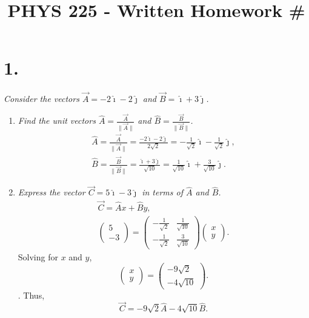 \documentclass[12pt]{article}
\title{\vspace{-2\baselineskip}PHYS 225 - Written Homework \#\HOMEWORKNUM}
\author{\NAME}
\date{\DATE}
\begin{document}
\maketitle


\section*{1.}
\textit{Consider the vectors $\vec{A} = -2\hat{\imath} - 2\hat{\jmath}$ and
$\vec{B} = \hat{\imath} + 3\hat{\jmath}$.}
\begin{enumerate}[label=(\alph*)]
	\item \textit{Find the unit vectors
	$\hat{A} = \frac{\vec{A}}{\|\vec{A}\|}$ and
	$\hat{B} = \frac{\vec{B}}{\|\vec{B}\|}$.}
	\begin{gather*}
		\hat{A}
		= \frac{\vec{A}}{\|\vec{A}\|}
		= \frac{-2\hat{\imath} - 2\hat{\jmath}}{2\sqrt{2}}
		= \boxed{
			-\frac{1}{\sqrt{2}} \hat{\imath}
			- \frac{1}{\sqrt{2}} \hat{\jmath}
		}, \\
		\hat{B}
		= \frac{\vec{B}}{\|\vec{B}\|}
		= \frac{\hat{\imath} + 3\hat{\jmath}}{\sqrt{10}}
		= \boxed{
			\frac{1}{\sqrt{10}} \hat{\imath}
			+ \frac{3}{\sqrt{10}} \hat{\jmath}
		}.
	\end{gather*}
	\item \textit{Express the vector $\vec{C} = 5\hat{\imath} - 3\hat{\jmath}$
	in terms of $\hat{A}$ and $\hat{B}$.}
	\begin{gather*}
		\vec{C} = \hat{A}x + \hat{B}y, \\
		\begin{pmatrix} 5 \\ -3 \end{pmatrix}
		=
		\begin{pmatrix}
			-\frac{1}{\sqrt{2}} & \frac{1}{\sqrt{10}} \\
			-\frac{1}{\sqrt{2}} & \frac{3}{\sqrt{10}}
		\end{pmatrix}
		\begin{pmatrix} x \\ y \end{pmatrix}.
	\end{gather*}
	Solving for $x$ and $y$,
	\begin{equation*}
		\begin{pmatrix} x \\ y \end{pmatrix}
		= \begin{pmatrix} -9\sqrt{2} \\ -4\sqrt{10} \end{pmatrix}.
	\end{equation*}.
	Thus,
	\begin{equation*}
		\vec{C} = \boxed{
			-9\sqrt{2}\hat{A} - 4\sqrt{10}\hat{B}
		}.
	\end{equation*}
\end{enumerate}
\end{document}
